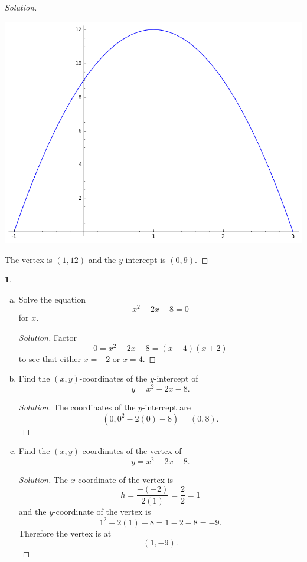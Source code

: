 \documentclass[12pt]{amsart}
\theoremstyle{definition}
\newtheorem{thm}{}
\begin{document}
\begin{proof}[Solution]
\begin{center}
    \includegraphics[scale=0.5]{parabolaUp.png}
  \end{center}
  The vertex is $(1,12)$ and the $y$-intercept is $(0,9)$.
\end{proof}

\newpage

\begin{thm}\label{problem: quick and dirty}
  \begin{enumerate}[(a)]
  \item\label{quick and dirty: roots}
    Solve the equation
    $$x^2 - 2x - 8 = 0$$
    for $x$.
    \begin{proof}[Solution]
      Factor
      $$0 = x^2 - 2x - 8 = (x - 4)(x + 2)$$
      to see that either $x = -2$ or $x = 4$.
    \end{proof}
  \item\label{quick and dirty: y-intercept}
    Find the $(x,y)$-coordinates of the $y$-intercept of
    $$y = x^2 - 2x - 8.$$
    \begin{proof}[Solution]
      The coordinates of the $y$-intercept are
      $$(0,0^2 - 2(0) - 8) = (0, 8).$$
    \end{proof}
  \item\label{quick and dirty: vertex}
    Find the $(x,y)$-coordinates of the vertex of
    $$y = x^2 - 2x - 8.$$
    \begin{proof}[Solution]
      The $x$-coordinate of the vertex is
      $$h = \frac{-(-2)}{2(1)} = \frac{2}{2} = 1$$
      and the $y$-coordinate of the vertex is
      $$1^2 - 2(1) - 8 = 1 - 2 - 8 = -9.$$
      Therefore the vertex is at
      $$(1,-9).$$
    \end{proof}
  \end{enumerate}
\end{thm}
\end{document}

